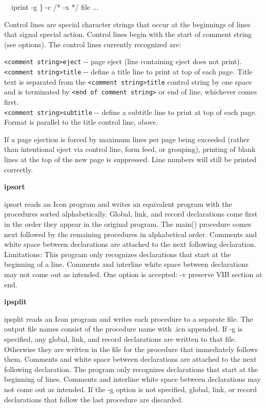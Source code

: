 {{\sffamily
\ \ iprint -g {\textquotesingle} \}{\textquotesingle} -c
{\textquotesingle}/*{\textquotesingle} -x
{\textquotesingle}*/{\textquotesingle} file ... }

Control lines are special character strings that occur at the beginnings
of lines that signal special action. Control lines begin with the start
of comment string (see options). The control lines currently recognized
are:

\texttt{{\textless}comment string{\textgreater}eject} -{}- page eject
(line containing {\textquotedbl}eject{\textquotedbl} does not
print).\\
\texttt{{\textless}comment string{\textgreater}title} -{}- define a
title line to print at top of each page. Title text is separated from
the \texttt{{\textless}comment string{\textgreater}title} control
string by one space and is terminated by \texttt{{\textless}end of
comment string{\textgreater}} or end of line, whichever comes
first.\\
\texttt{{\textless}comment string{\textgreater}subtitle} -{}- define a
subtitle line to print at top of each page. Format is parallel to the
{\textquotedbl}title{\textquotedbl} control line, above.

If a page ejection is forced by maximum lines per page being exceeded
(rather than intentional eject via control line, form feed, or
grouping), printing of blank lines at the top of the new page is
suppressed. Line numbers will still be printed correctly. 

{\sffamily\bfseries
ipsort\ \ \ \ \ \ \ \ \ \ \ \ \ \ \ \ \ \ \ \ \ \ }

\textsf{ipsort} reads an Icon program and writes an equivalent program
with the procedures sorted
alphabetically. Global, link, and record declarations come first in the
order they appear in the original program. The main() procedure comes
next followed by the remaining procedures in alphabetical order.
Comments and white space between declarations are attached to the next
following declaration. Limitations: This program only recognizes
declarations that start at the beginning of a line. Comments and
interline white space between declarations may not come out as
intended. One option is accepted: -v preserve VIB section at end.

{\sffamily\bfseries
ipsplit\ \ \ \ \ \ \ \ \ \ \ \ \ \ \ \ \ \ \ \ \ \ }

\textsf{ipsplit} reads an Icon program and writes each procedure to a
separate file. The output file names consist of the procedure name with
\textsf{.icn} appended. If \textsf{{}-g} is specified, any global,
link, and record declarations are written to that file. Otherwise they
are written in the file for the procedure that immediately follows
them. Comments and white space between declarations are attached to the
next following declaration. The program only recognizes declarations
that start at the beginning of lines. Comments and interline white
space between declarations may not come out as intended. If the -g
option is not specified, global, link, or record declarations that
follow the last procedure are discarded.

}
